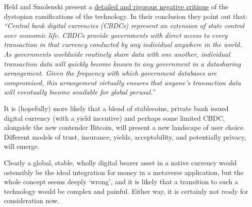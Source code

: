 Held and Smolenski present a \href{https://www.btcpolicy.org/articles/why-the-u-s-should-reject-central-bank-digital-currencies}{detailed and rigorous negative critique} of the dystopian ramifications of the technology. In their conclusion they point out that: \textit{``Central bank digital currencies (CBDCs) represent an extension of state control over economic life. CBDCs provide governments with direct access to every transaction in that currency conducted by any individual anywhere in the world. As governments worldwide routinely share data with one another, individual transaction data will quickly become known to any government in a datasharing arrangement. Given the frequency with which government databases are compromised, this arrangement virtually ensures that anyone’s transaction data will eventually become available for global perusal.''}\par
It is (hopefully) more likely that a blend of stablecoins, private bank issued digital currency (with a yield incentive) and perhaps some limited CBDC, alongside the new contender Bitcoin, will present a new landscape of user choice. Different models of trust, insurance, yields, acceptability, and potentially privacy, will emerge. \par
Clearly a global, stable, wholly digital bearer asset in a native currency would ostensibly be the ideal integration for money in a metaverse application, but the whole concept seems deeply `wrong', and it is likely that a transition to such a technology would be complex and painful. Either way, it is certainly not ready for consideration now.
